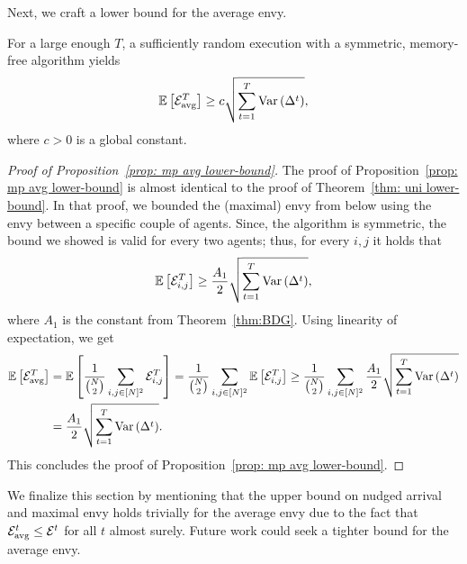 Next, we craft a lower bound for the average envy.
\begin{proposition}\label{prop: mp avg lower-bound}
    For a large enough $T$, a sufficiently random execution with a symmetric, memory-free algorithm yields
    \[\mathbb{E}\left[ \mathcal{E}_{\textnormal{avg}}^T \right] \geq c\sqrt{ \sum^{T}_{t=1}{\mathrm{Var}\left( \Delta^t \right)}},\]
    where $c> 0$ is a global constant.    
\end{proposition}


\begin{proof}[Proof of Proposition~\ref{prop: mp avg lower-bound}]
The proof of Proposition~\ref{prop: mp avg lower-bound} is almost identical to the proof of Theorem~\ref{thm: uni lower-bound}. In that proof, we bounded the (maximal) envy from below using the envy between a specific couple of agents.
Since, the algorithm is symmetric, the bound we showed is valid for every two agents;
thus, for every $i,j$ it holds that
\begin{align*}
\mathbb{E}\left[ \mathcal{E}_{i,j}^T \right] \geq \frac{A_1}{2}\sqrt{ \sum^{T}_{t=1}{\mathrm{Var}\left( \Delta^t \right)} },
\end{align*}
where $A_1$ is the constant from Theorem~\ref{thm:BDG}. Using linearity of expectation, we get
\begin{align*}
\mathbb{E}\left[ \mathcal{E}_{\textnormal{avg}}^T \right] & =
\mathbb{E}\left[ \frac{1}{\binom{N}{2}}\sum_{i,j \in [N]^2}{\mathcal{E}_{i,j}^T} \right] =
\frac{1}{\binom{N}{2}}\sum_{i,j \in [N]^2}{\mathbb{E}\left[ \mathcal{E}_{i,j}^T \right]}
\geq
\frac{1}{\binom{N}{2}}\sum_{i,j \in [N]^2} {\frac{A_1}{2}\sqrt{ \sum^{T}_{t=1}{\mathrm{Var}\left( \Delta^t \right)} }}
\\&=
\frac{A_1}{2}\sqrt{ \sum^{T}_{t=1}{\mathrm{Var}\left( \Delta^t \right)} }.
\end{align*}
This concludes the proof of Proposition~\ref{prop: mp avg lower-bound}.
\end{proof}
We finalize this section by mentioning that the upper bound on nudged arrival and maximal envy holds trivially for the average envy due to the fact that $\mathcal{E}_{\textnormal{avg}}^t \leq \mathcal{E}^t$ for all $t$  almost surely. Future work could seek a tighter bound for the average envy.

